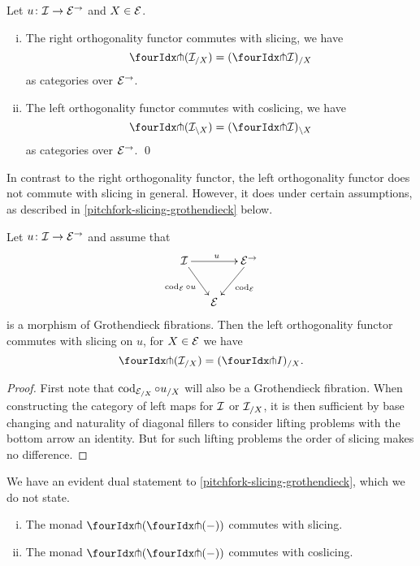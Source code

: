 \documentclass[reqno,10pt,a4paper,oneside,draft]{amsart}
\begin{document}
\begin{proposition} \label{pitchfork-slicing}
Let $u \co \cal{I} \to \catE^\to$ and $X \in \cal{E}$.
\begin{enumerate}[(i)]
\item The right orthogonality functor commutes with slicing, \ie we have
\[
  \liftr{(\cal{I}_{/X})} = (\liftr{\cal{I}})_{/X}
\]
as categories over $\catE^\to$.
\item The left orthogonality functor commutes with coslicing, \ie we have
\[
  \liftl{(\cal{I}_{\backslash X})} = (\liftl{\cal{I}})_{\backslash X}
\]
as categories over $\catE^\to$.
\qed
\end{enumerate}
\end{proposition}

In contrast to the right orthogonality functor, the left orthogonality functor does not commute with slicing in general.
However, it does under certain assumptions, as described in \cref{pitchfork-slicing-grothendieck} below.

\begin{proposition} \label{pitchfork-slicing-grothendieck}
Let $u \co \cal{I} \to \cal{E}^\to$ and assume that
\[
\xymatrix@C-1em{
  \cal{I}
  \ar[rr]^{u}
  \ar[dr]_{\cod_{\cal{E}} \cc u}
&&
  \cal{E}^\to
  \ar[dl]^{\cod_{\cal{E}}}
\\&
  \cal{E}
}
\]
is a morphism of Grothendieck fibrations.
Then the left orthogonality functor commutes with slicing on $u$, \ie for $X \in \cal{E}$ we have
\[
  \liftl{(\cal{I}_{/X})} = (\liftl{I})_{/X}
.\]
\end{proposition}

\begin{proof}
First note that $\cod_{\cal{E}_{/X}} \cc u_{/X}$ will also be a Grothendieck fibration.
When constructing the category of left maps for $\cal{I}$ or $\cal{I}_{/X}$, it is then sufficient by base changing and naturality of diagonal fillers to consider lifting problems with the bottom arrow an identity.
But for such lifting problems the order of slicing makes no difference.
\end{proof}

We have an evident dual statement to \cref{pitchfork-slicing-grothendieck}, which we do not state.

\begin{corollary} \label{pitchfork-slicing-monad}
\leavevmode
\begin{enumerate}[(i)]
\item The monad $\liftl{(\liftr{(-)})}$ commutes with slicing.
\item The monad $\liftr{(\liftl{(-)})}$ commutes with coslicing.
\end{enumerate}
\end{corollary}
\end{document}
